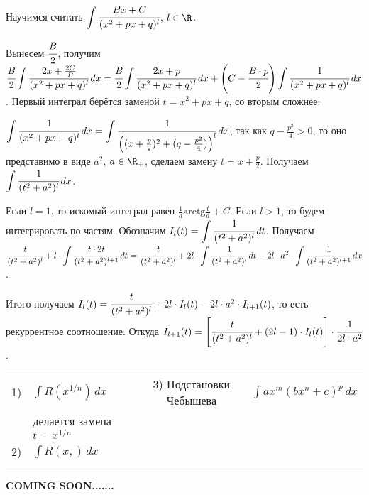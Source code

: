 Научимся считать $\displaystyle \int \cfrac{Bx + C}{(x^2 + px + q)^{l}}$, $l \in \R$. 

Вынесем $\cfrac{B}{2}$, получим $\displaystyle \cfrac{B}{2} \int \cfrac{2x + \frac{2 C}{B}}{(x^2 + px + q)^{l}} \, dx = \cfrac{B}{2} \int \cfrac{2x + p}{(x^2 + px + q)^{l}} \, dx + \left(C - \cfrac{B \cdot p}{2}\right) \int \cfrac{1}{(x^2 + px + q)^{l}} \, dx$. Первый интеграл берётся заменой $t = x^2 + px + q$, со вторым сложнее:

$\displaystyle \int \cfrac{1}{(x^2 + px + q)^{l}} \, dx = \int \cfrac{1}{\left((x + \frac{p}{2})^2 + (q - \frac{p^2}{4})\right)^{l}} \, dx$, так как $q - \frac{p^2}{4} > 0$, то оно представимо в виде $a^2$, $a \in \R_{+}$, сделаем замену $t = x + \frac{p}{2}$. Получаем $\displaystyle \int \cfrac{1}{(t^2 + a^2)^{l}} \, dx$.

Если $l = 1$, то искомый интеграл равен $\frac{1}{a} \text{arctg} \frac{t}{a} + C$. Если $l > 1$, то будем интегрировать по частям. Обозначим $\displaystyle I_{l} (t) = \int \cfrac{1}{(t^2 + a^2)^{l}} \, dt$. Получаем $\displaystyle \cfrac{t}{(t^2 + a^2)^{l}} + l \cdot \int \cfrac{t \cdot 2t}{(t^2 + a^2)^{l + 1}} \, dt = \cfrac{t}{(t^2 + a^2)^{l}} + 2l \cdot \int \cfrac{1}{(t^2 + a^2)^{l}} \, dt - 2 l \cdot a^2 \cdot \int \cfrac{1}{(t^2 + a^2)^{l + 1}} \, dx$.

Итого получаем $I_{l} (t) = \cfrac{t}{(t^2 + a^2)^{l}} + 2l \cdot I_{l} (t) - 2l \cdot a^2 \cdot I_{l + 1} (t)$, то есть рекуррентное соотношение. Откуда $I_{l + 1} (t) = \left[ \cfrac{t}{(t^2 + a^2)^{l}} + (2l - 1) \cdot I_{l} (t) \right] \cdot \cfrac{1}{2l \cdot a^{2}}$.

\begin{table}[h]
\begin{tabular}{clcl}
1) & $\displaystyle \int R (x^{1/n}) \, dx$ & 3) Подстановки Чебышева & $\displaystyle \int a x^{m} (b x^{n} + c)^{p} \, dx$  \\
& делается замена $t = x^{1/n}$ &  & \\
2) & $\displaystyle \int R (x, ) \, dx$ & & \\
 &  &  &
\end{tabular}
\end{table}

\begin{theorem}
    
\end{theorem}

\textbf{COMING SOON.......}

\newpage

